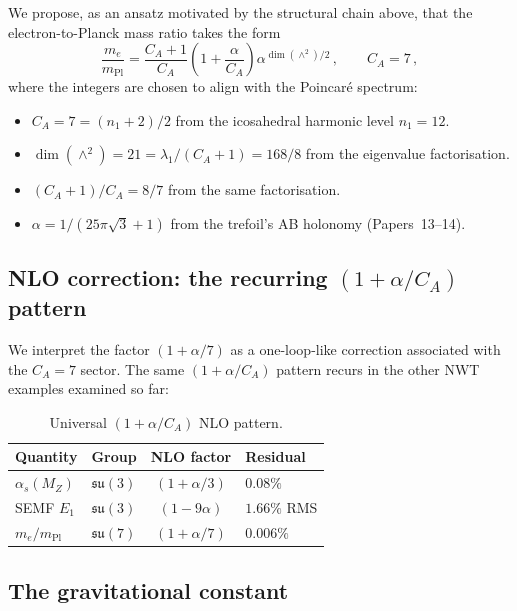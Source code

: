 \documentclass[11pt]{article}
\newcommand{\su}{\mathfrak{su}}
\newcommand{\CA}{C_A}
\begin{document}
We propose, as an ansatz motivated by the structural chain above,
that the electron-to-Planck mass ratio takes the form
\begin{equation}
\label{eq:hierarchy}
\boxed{
  \frac{m_e}{m_\text{Pl}}
  = \frac{\CA + 1}{\CA}
    \left(1 + \frac{\alpha}{\CA}\right)
    \alpha^{\dim(\wedge^2)/2}\,,
  \qquad \CA = 7\,,
}
\end{equation}
where the integers are chosen to align with the Poincar\'e
spectrum:
\begin{itemize}\setlength\itemsep{0pt}
  \item $\CA = 7 = (n_1 + 2)/2$ from the icosahedral harmonic
    level $n_1 = 12$.
  \item $\dim(\wedge^2) = 21 = \lambda_1/(\CA + 1) = 168/8$
    from the eigenvalue factorisation.
  \item $(\CA + 1)/\CA = 8/7$ from the same factorisation.
  \item $\alpha = 1/(25\pi\sqrt{3}+1)$ from the trefoil's AB
    holonomy (Papers~13--14).
\end{itemize}

\subsection{NLO correction: the recurring $(1 + \alpha/\CA)$ pattern}
\label{sec:nlo}

We interpret the factor $(1 + \alpha/7)$ as a one-loop-like
correction associated with the $\CA = 7$ sector.  The same
$(1 + \alpha/\CA)$ pattern recurs in the other NWT examples
examined so far:

\begin{table}[h]
\centering
\caption{Universal $(1 + \alpha/\CA)$ NLO pattern.}
\label{tab:nlo}
\begin{tabular}{llcl}
\toprule
Quantity & Group & NLO factor & Residual \\
\midrule
$\alpha_s(M_Z)$ & $\su(3)$ & $(1 + \alpha/3)$ & $0.08\%$ \\
SEMF $E_1$ & $\su(3)$ & $(1 - 9\alpha)$ & $1.66\%$ RMS \\
$m_e/m_\text{Pl}$ & $\su(7)$ & $(1 + \alpha/7)$ & $\mathbf{0.006\%}$ \\
\bottomrule
\end{tabular}
\end{table}

\subsection{The gravitational constant}
\end{document}
